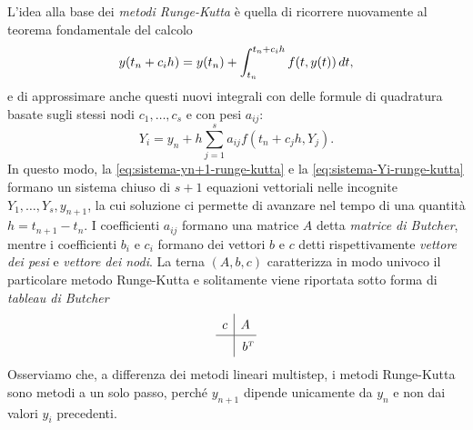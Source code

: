 L'idea alla base dei \emph{metodi Runge-Kutta} è quella di ricorrere
nuovamente al teorema fondamentale del calcolo
\[
y(t_n + c_i h) = y(t_n) + \int_{t_n}^{t_n+c_i h} f(t,y(t)) \, dt,
\]
e di approssimare anche questi nuovi integrali con delle formule
di quadratura basate sugli stessi nodi $c_1, \dots, c_s$ e con pesi $a_{ij}$:
\begin{equation} \label{eq:sistema-Yi-runge-kutta}
Y_i = y_n + h \sum_{j=1}^s a_{ij} f(t_n + c_j h, Y_j).
\end{equation}
In questo modo, la \eqref{eq:sistema-yn+1-runge-kutta} e la
\eqref{eq:sistema-Yi-runge-kutta} formano un sistema chiuso di $s+1$ equazioni
vettoriali nelle incognite $Y_1,\dots,Y_s,y_{n+1}$, la cui soluzione
ci permette di avanzare nel tempo di una quantità $h = t_{n+1}-t_n$.
I coefficienti $a_{ij}$ formano una matrice $A$ detta \emph{matrice di Butcher},
mentre i coefficienti $b_i$ e $c_i$ formano dei vettori $b$ e $c$ detti
rispettivamente \emph{vettore dei pesi} e \emph{vettore dei nodi}.
La terna $(A,b,c)$ caratterizza in modo univoco il particolare metodo Runge-Kutta
e solitamente viene riportata sotto forma di \emph{tableau di Butcher}
\[
\renewcommand\arraystretch{1.4}
\begin{array}
{c|c}
c & A \\
\hline
 & b^{\mathrlap{\scriptscriptstyle T}} \\
\end{array}
\]
Osserviamo che, a differenza dei metodi lineari multistep, i metodi Runge-Kutta
sono metodi a un solo passo, perché $y_{n+1}$ dipende unicamente da $y_n$
e non dai valori $y_i$ precedenti.


